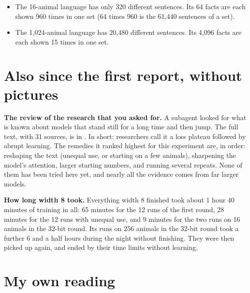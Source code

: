 
\begin{itemize}
\item The 16-animal language has only 320 different sentences. Its 64 facts are each shown
      960 times in one set (64 times 960 is the 61,440 sentences of a set).
\item The 1,024-animal language has 20,480 different sentences. Its 4,096 facts are each
      shown 15 times in one set.
\end{itemize}

\section{Also since the first report, without pictures}

\textbf{The review of the research that you asked for.} A subagent looked for what is known
about models that stand still for a long time and then jump. The full text, with 31 sources,
is in . In short: researchers call it a loss plateau followed
by abrupt learning. The remedies it ranked highest for this experiment are, in order:
reshaping the text (unequal use, or starting on a few animals), sharpening the model's
attention, larger starting numbers, and running several repeats. None of them has been tried
here yet, and nearly all the evidence comes from far larger models.

\textbf{How long width 8 took.} Everything width 8 finished took about 1 hour 40 minutes of
training in all: 65 minutes for the 12 runs of the first round, 28 minutes for the 12 runs
with unequal use, and 9 minutes for the two runs on 16 animals in the 32-bit round. Its runs
on 256 animals in the 32-bit round took a further 6 and a half hours during the night without
finishing. They were then picked up again, and ended by their time limits without learning.

\section{My own reading}\label{sec:tview}

